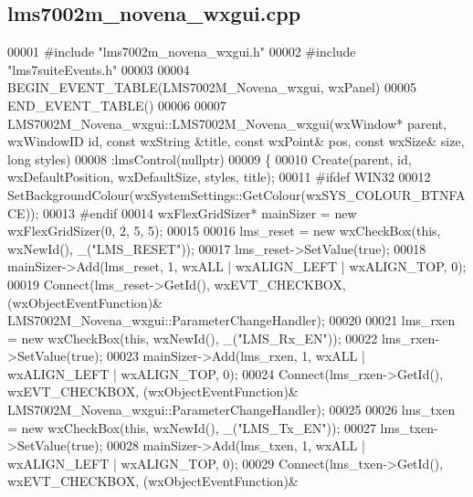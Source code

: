 \subsection{lms7002m\+\_\+novena\+\_\+wxgui.\+cpp}
\label{lms7002m__novena__wxgui_8cpp_source}

\begin{DoxyCode}
00001 \textcolor{preprocessor}{#include "lms7002m_novena_wxgui.h"}
00002 \textcolor{preprocessor}{#include "lms7suiteEvents.h"}
00003 
00004 BEGIN\_EVENT\_TABLE(LMS7002M_Novena_wxgui, wxPanel)
00005 END\_EVENT\_TABLE()
00006 
00007 LMS7002M_Novena_wxgui::LMS7002M_Novena_wxgui(wxWindow* parent, wxWindowID \textcolor{keywordtype}{id}, const wxString &title, const 
      wxPoint& pos, const wxSize& size, \textcolor{keywordtype}{long} styles)
00008     :lmsControl(\textcolor{keywordtype}{nullptr})
00009 \{
00010     Create(parent, \textcolor{keywordtype}{id}, wxDefaultPosition, wxDefaultSize, styles, title);
00011 \textcolor{preprocessor}{#ifdef WIN32}
00012     SetBackgroundColour(wxSystemSettings::GetColour(wxSYS\_COLOUR\_BTNFACE));
00013 \textcolor{preprocessor}{#endif}
00014     wxFlexGridSizer* mainSizer = \textcolor{keyword}{new} wxFlexGridSizer(0, 2, 5, 5);
00015 
00016     lms\_reset = \textcolor{keyword}{new} wxCheckBox(\textcolor{keyword}{this}, wxNewId(), \_(\textcolor{stringliteral}{"LMS\_RESET"}));
00017     lms\_reset->SetValue(\textcolor{keyword}{true});
00018     mainSizer->Add(lms\_reset, 1, wxALL | wxALIGN\_LEFT | wxALIGN\_TOP, 0);
00019     Connect(lms\_reset->GetId(), wxEVT\_CHECKBOX, (wxObjectEventFunction)&
      LMS7002M_Novena_wxgui::ParameterChangeHandler);
00020 
00021     lms\_rxen = \textcolor{keyword}{new} wxCheckBox(\textcolor{keyword}{this}, wxNewId(), \_(\textcolor{stringliteral}{"LMS\_Rx\_EN"}));
00022     lms\_rxen->SetValue(\textcolor{keyword}{true});
00023     mainSizer->Add(lms\_rxen, 1, wxALL | wxALIGN\_LEFT | wxALIGN\_TOP, 0);
00024     Connect(lms\_rxen->GetId(), wxEVT\_CHECKBOX, (wxObjectEventFunction)&
      LMS7002M_Novena_wxgui::ParameterChangeHandler);
00025 
00026     lms\_txen = \textcolor{keyword}{new} wxCheckBox(\textcolor{keyword}{this}, wxNewId(), \_(\textcolor{stringliteral}{"LMS\_Tx\_EN"}));
00027     lms\_txen->SetValue(\textcolor{keyword}{true});
00028     mainSizer->Add(lms\_txen, 1, wxALL | wxALIGN\_LEFT | wxALIGN\_TOP, 0);
00029     Connect(lms\_txen->GetId(), wxEVT\_CHECKBOX, (wxObjectEventFunction)&

\end{DoxyCode}
